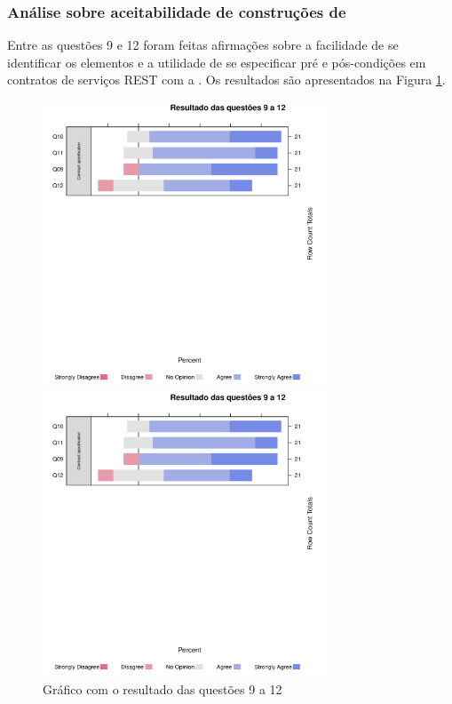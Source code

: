 \subsubsection{Análise sobre aceitabilidade de construções de \designbycontract{}}

Entre as questões 9 e 12 foram feitas afirmações sobre a facilidade de se
identificar os elementos e a utilidade de se especificar pré e pós-condições em
contratos de serviços REST com a \neoidl{}. Os resultados são apresentados na
Figura \ref{Respostas9a12}. 

\begin{figure}[!htb]
\centering
\includegraphics[width=85mm,trim = 6mm 115mm 6mm 
10mm,clip]{img/GraficoResultadoQuestoes9a12.pdf}

\includegraphics[width=85mm,trim = 6mm 0mm 6mm 
170mm,clip]{img/GraficoResultadoQuestoes9a12.pdf}

\caption{Gráfico com o resultado das questões 9 a 12}
\label{Respostas9a12}
\end{figure}

